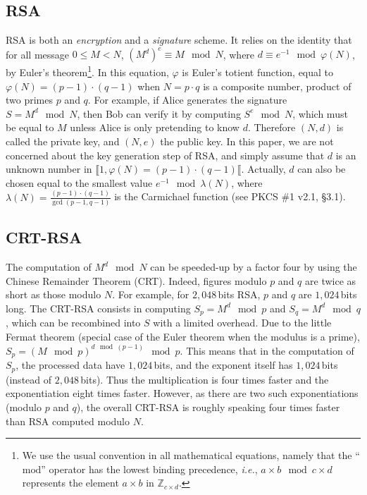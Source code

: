 \documentclass[10pt]{article}
\theoremstyle{definition}
\theoremstyle{theorem}
\newcommand{\Z}{\mathbb{Z}}
\newcommand{\ie}{\textit{i.e.}}
\begin{document}
\subsection{RSA}

RSA is both an \emph{encryption} and a \emph{signature} scheme.
It relies on the identity that for all message $0\leq M<N$,
$(M^d)^e \equiv M \mod N$, where $d \equiv e^{-1} \mod \varphi(N)$, by Euler's theorem\footnote{We use the usual convention in all mathematical equations, namely that the ``$\text{mod}$'' operator has the lowest binding precedence,
\ie, $a \times b \mod c \times d$ represents the element $a \times b$ in $\Z_{c \times d}$.}.
In this equation, $\varphi$ is Euler's totient function, equal to $\varphi(N)=(p-1) \cdot (q-1)$ when $N=p \cdot q$ is a composite number, product of two primes $p$ and $q$.
For example, if Alice generates the signature $S=M^d \mod N$,
then Bob can verify it by computing $S^e \mod N$, which must be equal to $M$ unless Alice is only pretending to know $d$.
Therefore $(N,d)$ is called the private key, and $(N,e)$ the public key.
In this paper, we are not concerned about the key generation step of RSA,
and simply assume that $d$ is an unknown number in $\llbracket 1, \varphi(N)=(p-1) \cdot (q-1)\llbracket$.
Actually, $d$ can also be chosen equal to the smallest value $e^{-1} \mod \lambda(N)$,
where $\lambda(N) = \frac{(p-1) \cdot (q-1)}{\gcd(p-1, q-1)}$ is the Carmichael function (see PKCS \#1 v2.1, \S 3.1).


\subsection{CRT-RSA}

The computation of $M^d \mod N$ can be speeded-up by a factor four by using the Chinese Remainder Theorem (CRT).
Indeed, figures modulo $p$ and $q$ are twice as short as those modulo $N$.
For example, for $2,048$\,bits RSA, $p$ and $q$ are $1,024$\,bits long.
The CRT-RSA consists in computing $S_p = M^d \mod p$ and $S_q = M^d \mod q$,
which can be recombined into $S$ with a limited overhead.
Due to the little Fermat theorem (special case of the Euler theorem when the modulus is a prime),
$S_p = (M \mod p)^{d \mod (p-1)} \mod p$.
This means that in the computation of $S_p$, the processed data have $1,024$\,bits,
and the exponent itself has $1,024$\,bits (instead of $2,048$\,bits).
Thus the multiplication is four times faster and the exponentiation eight times faster.
However, as there are two such exponentiations (modulo $p$ and $q$), the overall CRT-RSA is roughly speaking four times faster than RSA computed modulo $N$.
\end{document}
